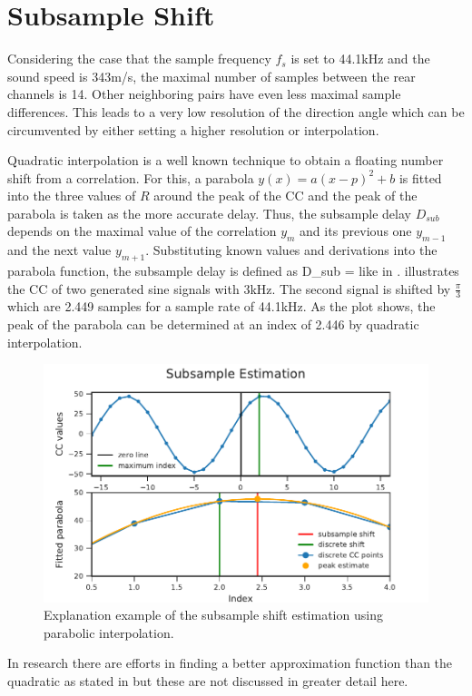 \section{Subsample Shift}
\label{sec:02_subsampleShift}

Considering the case that the sample frequency $f_s$ is set to 44.1\si{\kilo\hertz}
and the sound speed is 343\si{m/s}, the maximal number of samples
between the rear channels is 14.
Other neighboring pairs have even less maximal sample differences.
This leads to a very low resolution of the direction angle which can be
circumvented by either setting a higher resolution or interpolation.

Quadratic interpolation is a well known technique to obtain a floating number
shift from a correlation.
For this, a parabola $y(x) = a(x-p)^2+b$ is fitted into the three values of $R$ around the peak
of the \ac{CC} and the peak of the parabola is taken as the more accurate
delay.
Thus, the subsample delay $D_{sub}$ depends on the maximal value of the correlation $y_m$
and its previous one $y_{m-1}$ and the next value $y_{m+1}$.
Substituting known values and derivations into the parabola function,
the subsample delay is defined as
\bal
	D_{sub} = 
	\label{eq:02_subsample}
\eal
like in \cite{C_H_subsampleDelay}.
 illustrates the \ac{CC} of two generated sine signals with 3\si{\kilo\hertz}.
The second signal is shifted by $\frac{\pi}{3}$ which are 2.449 samples for a sample rate
of 44.1kHz.
As the plot shows, the peak of the parabola can be determined at an index of 2.446 by
quadratic interpolation.
\begin{figure}[ht]
	\centering
		\includegraphics[]{figures/subsample_shift}
	\caption{Explanation example of the subsample shift estimation using parabolic interpolation.}
    \label{fig:02_subsampleShift}
\end{figure}
In research there are efforts in finding a better approximation function than the quadratic as stated
in \cite{S_L_subsampleInterpolation} but these are not discussed in greater detail here.
